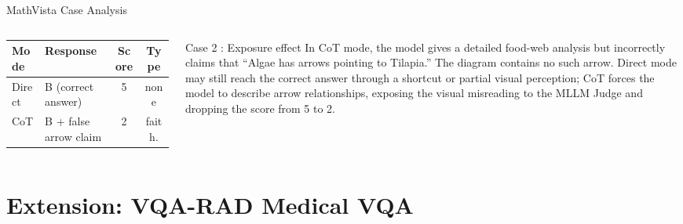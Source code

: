 \documentclass[9pt,aspectratio=169]{beamer}
\begin{document}
\begin{frame}{MathVista Case Analysis}
\begin{columns}[T,onlytextwidth]
      \vspace{0.15em}
      \scriptsize
      \renewcommand{\arraystretch}{0.86}
      \setlength{\tabcolsep}{3pt}
      \begin{tabular}{llcc}
        \toprule
        Mode & Response & Score & Type \\
        \midrule
        Direct & B (correct answer) & 5 & none \\
        CoT & B + false arrow claim & 2 & faith. \\
        \bottomrule
      \end{tabular}

      \begin{exampleblock}{Case 2 : Exposure effect}
        \footnotesize
        In CoT mode, the model gives a detailed food-web analysis but
        incorrectly claims that ``Algae has arrows pointing to Tilapia.''
        The diagram contains no such arrow. Direct mode may still reach
        the correct answer through a shortcut or partial visual
        perception; CoT forces the model to describe arrow relationships,
        exposing the visual misreading to the MLLM Judge and dropping the
        score from 5 to 2.
      \end{exampleblock}
  \end{columns}
\end{frame}

\section{Extension: VQA-RAD Medical VQA}
\end{document}
